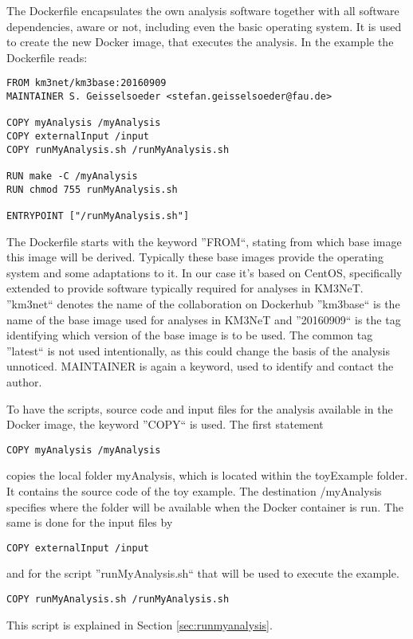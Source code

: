 \documentclass[a4paper, twoside, 11pt]{article}
\begin{document}
The Dockerfile encapsulates the own analysis software together 
with all software dependencies, aware or not, 
including even the basic operating system.
It is used to create the new Docker image, that executes the analysis. 
In the example the Dockerfile reads: 
\begin{lstlisting}[basicstyle=\ttfamily\small,columns=flexible,keepspaces=true,frame=single]
FROM km3net/km3base:20160909
MAINTAINER S. Geisselsoeder <stefan.geisselsoeder@fau.de>

COPY myAnalysis /myAnalysis
COPY externalInput /input
COPY runMyAnalysis.sh /runMyAnalysis.sh

RUN make -C /myAnalysis
RUN chmod 755 runMyAnalysis.sh

ENTRYPOINT ["/runMyAnalysis.sh"]
\end{lstlisting}
The Dockerfile starts with the keyword ''FROM``, 
stating from which base image this image will be derived.
Typically these base images provide the operating system and some adaptations to it. 
In our case it's based on CentOS, 
specifically extended to provide software typically required for analyses in KM3NeT. 
''km3net`` denotes the name of the collaboration on Dockerhub\cite{dockerhub:km3net}
''km3base`` is the name of the base image used for analyses in KM3NeT and 
''20160909`` is the tag identifying which version of the base image is to be used. 
The common tag ''latest`` is not used intentionally, as this could change the basis of the analysis unnoticed. 
MAINTAINER is again a keyword, used to identify and contact the author. 

\label{sec:addingYourCode}
To have the scripts, source code and input files for the analysis available in the Docker image, the keyword ''COPY`` is used.
The first statement 
\begin{lstlisting}[basicstyle=\ttfamily\small,columns=flexible,keepspaces=true,frame=single]
COPY myAnalysis /myAnalysis
\end{lstlisting}
copies the local folder myAnalysis, which is located within the toyExample folder. 
It contains the source code of the toy example.
The destination /myAnalysis specifies where the folder will be available when the Docker container is run. 
The same is done for the input files by
\begin{lstlisting}[basicstyle=\ttfamily\small,columns=flexible,keepspaces=true,frame=single]
COPY externalInput /input 
\end{lstlisting}
and for the script ''runMyAnalysis.sh`` that will be used to execute the example. 
\begin{lstlisting}[basicstyle=\ttfamily\small,columns=flexible,keepspaces=true,frame=single]
COPY runMyAnalysis.sh /runMyAnalysis.sh
\end{lstlisting}
This script is explained in Section \ref{sec:runmyanalysis}.
\end{document}
